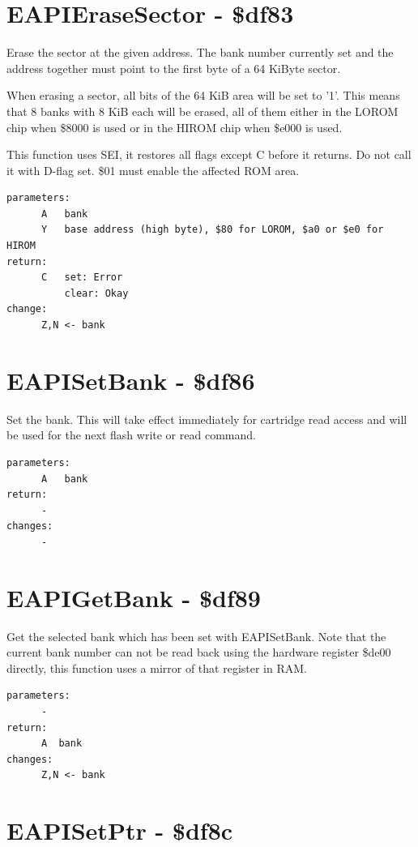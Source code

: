 \documentclass[a4paper,oneside]{memoir}
\begin{document}
\section{EAPIEraseSector - \$df83}

Erase the sector at the given address. The bank number currently set and the
address together must point to the first byte of a 64 KiByte sector.

When erasing a sector, all bits of the 64 KiB area will be set to '1'.
This means that 8 banks with 8 KiB each will be erased, all of them either
in the LOROM chip when \$8000 is used or in the HIROM chip when \$e000 is
used.

This function uses SEI, it restores all flags except C before it returns.
Do not call it with D-flag set. \$01 must enable the affected ROM area.

\begin{verbatim}
parameters:
      A   bank
      Y   base address (high byte), $80 for LOROM, $a0 or $e0 for HIROM
return:
      C   set: Error
          clear: Okay
change:
      Z,N <- bank
\end{verbatim}


\section{EAPISetBank - \$df86}

Set the bank. This will take effect immediately for cartridge read access
and will be used for the next flash write or read command.

\begin{verbatim}
parameters:
      A   bank
return:
      -
changes:
      -
\end{verbatim}


\section{EAPIGetBank - \$df89}

Get the selected bank which has been set with EAPISetBank.
Note that the current bank number can not be read back using the hardware
register \$de00 directly, this function uses a mirror of that register in RAM.

\begin{verbatim}
parameters:
      -
return:
      A  bank
changes:
      Z,N <- bank
\end{verbatim}


\section{EAPISetPtr - \$df8c}
\end{document}
